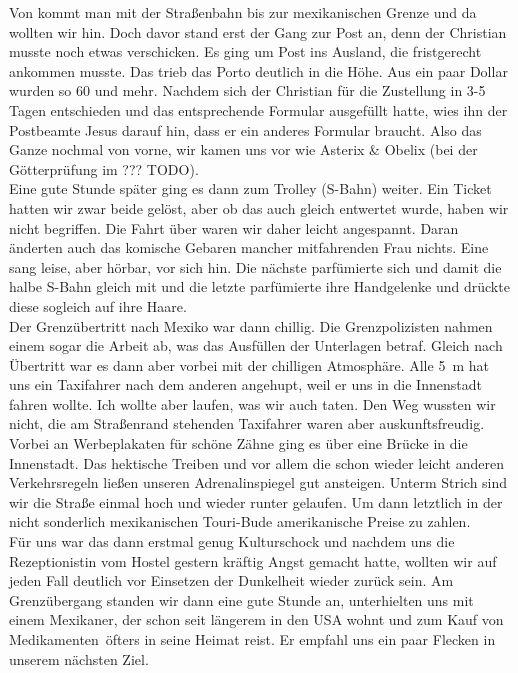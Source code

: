Von  kommt man mit der Straßenbahn bis zur mexikanischen Grenze und da wollten wir hin.
Doch davor stand erst der Gang zur Post an, denn der Christian musste noch etwas verschicken.
Es ging um Post ins Ausland, die fristgerecht ankommen musste.
Das trieb das Porto deutlich in die Höhe.
Aus ein paar Dollar wurden so 60 und mehr.
Nachdem sich der Christian für die Zustellung in 3-5 Tagen entschieden und das entsprechende Formular ausgefüllt hatte, wies ihn der Postbeamte Jesus darauf hin, dass er ein anderes Formular braucht.
Also das Ganze nochmal von vorne, wir kamen uns vor wie Asterix \& Obelix (bei der Götterprüfung im ??? TODO).\\

Eine gute Stunde später ging es dann zum Trolley (S-Bahn) weiter.
Ein Ticket hatten wir zwar beide gelöst, aber ob das auch gleich entwertet wurde, haben wir nicht begriffen.
Die Fahrt über waren wir daher leicht angespannt.
Daran änderten auch das komische Gebaren mancher mitfahrenden Frau nichts.
Eine sang leise, aber hörbar, vor sich hin.
Die nächste parfümierte sich und damit die halbe S-Bahn gleich mit und die letzte parfümierte ihre Handgelenke und drückte diese sogleich auf ihre Haare.\\

Der Grenzübertritt nach Mexiko war dann chillig.
Die Grenzpolizisten nahmen einem sogar die Arbeit ab, was das Ausfüllen der Unterlagen betraf.
Gleich nach Übertritt war es dann aber vorbei mit der chilligen Atmosphäre.
Alle 5~m hat uns ein Taxifahrer nach dem anderen angehupt, weil er uns in die Innenstadt fahren wollte.
Ich wollte aber laufen, was wir auch taten.
Den Weg wussten wir nicht, die am Straßenrand stehenden Taxifahrer waren aber auskunftsfreudig.\\

Vorbei an Werbeplakaten für schöne Zähne ging es über eine Brücke in die Innenstadt.
Das hektische Treiben und vor allem die schon wieder leicht anderen Verkehrsregeln ließen unseren Adrenalinspiegel gut ansteigen.
Unterm Strich sind wir die Straße einmal hoch und wieder runter gelaufen.
Um dann letztlich in der nicht sonderlich mexikanischen Touri-Bude amerikanische Preise zu zahlen.\\

Für uns war das dann erstmal genug Kulturschock und nachdem uns die Rezeptionistin vom Hostel gestern kräftig Angst gemacht hatte, wollten wir auf jeden Fall deutlich vor Einsetzen der Dunkelheit wieder zurück sein.
Am Grenzübergang standen wir dann eine gute Stunde an, unterhielten uns mit einem Mexikaner, der schon seit längerem in den USA wohnt und zum Kauf von \glqq Medikamenten\grqq \, öfters in seine Heimat reist.
Er empfahl uns ein paar Flecken in  unserem nächsten Ziel.
